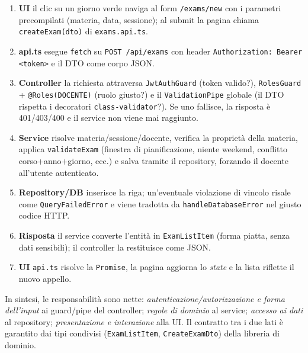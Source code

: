 \documentclass[11pt,a4paper,oneside]{report}
\newcommand{\code}[1]{\texttt{\small #1}}
\newcommand{\file}[1]{\texttt{\small #1}}
\begin{document}
\begin{enumerate}[leftmargin=1.6em]
  \item \textbf{UI} \textemdash{} il clic su un giorno verde naviga al form
        \code{/exams/new} con i parametri precompilati (materia, data, sessione);
        al submit la pagina chiama \code{createExam(dto)} di \file{exams.api.ts}.
  \item \textbf{api.ts} \textemdash{} esegue \code{fetch} su \code{POST
        /api/exams} con header \code{Authorization: Bearer <token>} e il DTO come
        corpo JSON.
  \item \textbf{Controller} \textemdash{} la richiesta attraversa
        \code{JwtAuthGuard} (token valido?), \code{RolesGuard} +
        \code{@Roles(DOCENTE)} (ruolo giusto?) e il \code{ValidationPipe} globale
        (il DTO rispetta i decoratori \code{class-validator}?). Se uno fallisce,
        la risposta è 401/403/400 e il service non viene mai raggiunto.
  \item \textbf{Service} \textemdash{} risolve materia/sessione/docente, verifica
        la proprietà della materia, applica \code{validateExam} (finestra di
        pianificazione, niente weekend, conflitto corso+anno+giorno, ecc.) e
        salva tramite il repository, forzando il docente all'utente autenticato.
  \item \textbf{Repository/DB} \textemdash{} inserisce la riga; un'eventuale
        violazione di vincolo risale come \code{QueryFailedError} e viene tradotta
        da \code{handleDatabaseError} nel giusto codice HTTP.
  \item \textbf{Risposta} \textemdash{} il service converte l'entità in
        \code{ExamListItem} (forma piatta, senza dati sensibili); il controller la
        restituisce come JSON.
  \item \textbf{UI} \textemdash{} \file{api.ts} risolve la \code{Promise}, la
        pagina aggiorna lo \emph{state} e la lista riflette il nuovo appello.
\end{enumerate}

In sintesi, le responsabilità sono nette: \emph{autenticazione/autorizzazione e
forma dell'input} ai guard/pipe del controller; \emph{regole di dominio} al
service; \emph{accesso ai dati} al repository; \emph{presentazione e interazione}
alla UI. Il contratto tra i due lati è garantito dai tipi condivisi
(\code{ExamListItem}, \code{CreateExamDto}) della libreria di dominio.
\end{document}
